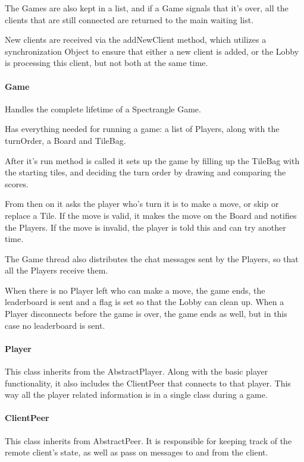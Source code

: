 \documentclass[12pt, letterpaper]{article}
\begin{document}
    The Games are also kept in a list, and if a Game signals that it's over, all the clients that are still connected
    are returned to the main waiting list.

    New clients are received via the addNewClient method, which utilizes a synchronization Object to ensure that
    either a new client is added, or the Lobby is processing this client, but not both at the same time.


    \paragraph{Game}
    Handles the complete lifetime of a Spectrangle Game.

    Has everything needed for running a game: a list of Players, along with the turnOrder, a Board and TileBag.

    After it's run method is called it sets up the game by filling up the TileBag with the starting tiles, and
    deciding the turn order by drawing and comparing the scores.

    From then on it asks the player who's turn it is to make a move, or skip or replace a Tile.
    If the move is valid, it makes the move on the Board and notifies the Players.
    If the move is invalid, the player is told this and can try another time.

    The Game thread also distributes the chat messages sent by the Players, so that all the Players receive them.

    When there is no Player left who can make a move, the game ends, the leaderboard is sent
    and a flag is set so that the Lobby can clean up.
    When a Player disconnects before the game is over, the game ends as well, but in this case no leaderboard is sent.


    \paragraph{Player}
    This class inherits from the AbstractPlayer.
    Along with the basic player functionality, it also includes the ClientPeer that connects to that player.
    This way all the player related information is in a single class during a game.

    \paragraph{ClientPeer}
    This class inherits from AbstractPeer.
    It is responsible for keeping track of the remote client's state,
    as well as pass on messages to and from the client.
\end{document}
